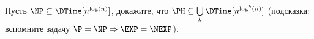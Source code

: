 Пусть $\NP \subseteq \DTime[n^{\log(n)}]$, докажите, что $\PH \subseteq \bigcup\limits_{k} \DTime[n^{\log^k(n)}]$ (подсказка:
вспомните задачу $\P = \NP \Rightarrow \EXP = \NEXP$).